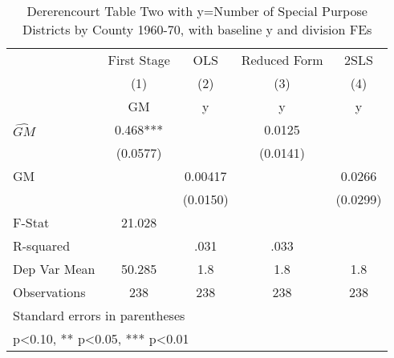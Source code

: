\begin{table}[htbp]\centering
\def\sym#1{\ifmmode^{#1}\else\(^{#1}\)\fi}
\caption{Dererencourt Table Two with y=Number of Special Purpose Districts by County 1960-70, with baseline y and division FEs}
\begin{tabular}{l*{4}{c}}
\toprule
                    & First Stage   &         OLS   &Reduced Form   &        2SLS   \\
                    &\multicolumn{1}{c}{(1)}&\multicolumn{1}{c}{(2)}&\multicolumn{1}{c}{(3)}&\multicolumn{1}{c}{(4)}\\
                    &\multicolumn{1}{c}{GM}&\multicolumn{1}{c}{y}&\multicolumn{1}{c}{y}&\multicolumn{1}{c}{y}\\
\midrule
$\hat{GM}$          &       0.468***&               &      0.0125   &               \\
                    &    (0.0577)   &               &    (0.0141)   &               \\
\addlinespace
GM                  &               &     0.00417   &               &      0.0266   \\
                    &               &    (0.0150)   &               &    (0.0299)   \\
\midrule
F-Stat              &      21.028   &               &               &               \\
R-squared           &               &        .031   &        .033   &               \\
Dep Var Mean        &      50.285   &         1.8   &         1.8   &         1.8   \\
Observations        &         238   &         238   &         238   &         238   \\
\bottomrule
\multicolumn{5}{l}{\footnotesize Standard errors in parentheses}\\
\multicolumn{5}{l}{\footnotesize * p<0.10, ** p<0.05, *** p<0.01}\\
\end{tabular}
\end{table}
